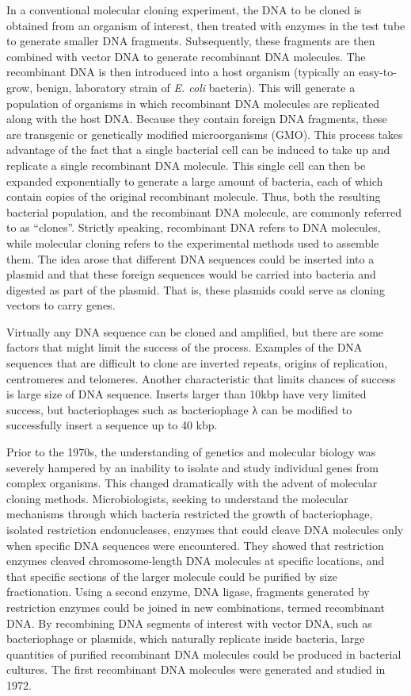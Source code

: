 In a conventional molecular cloning experiment, the DNA to be cloned is obtained from an organism of interest, then treated with enzymes in the test tube to generate smaller DNA fragments. Subsequently, these fragments are then combined with vector DNA to generate recombinant DNA molecules. The recombinant DNA is then introduced into a host organism (typically an easy-to-grow, benign, laboratory strain of \emph{E. coli} bacteria). This will generate a population of organisms in which recombinant DNA molecules are replicated along with the host DNA. Because they contain foreign DNA fragments, these are transgenic or genetically modified microorganisms (GMO). This process takes advantage of the fact that a single bacterial cell can be induced to take up and replicate a single recombinant DNA molecule. This single cell can then be expanded exponentially to generate a large amount of bacteria, each of which contain copies of the original recombinant molecule. Thus, both the resulting bacterial population, and the recombinant DNA molecule, are commonly referred to as ``clones''. Strictly speaking, recombinant DNA refers to DNA molecules, while molecular cloning refers to the experimental methods used to assemble them. The idea arose that different DNA sequences could be inserted into a plasmid and that these foreign sequences would be carried into bacteria and digested as part of the plasmid. That is, these plasmids could serve as cloning vectors to carry genes.

Virtually any DNA sequence can be cloned and amplified, but there are some factors that might limit the success of the process. Examples of the DNA sequences that are difficult to clone are inverted repeats, origins of replication, centromeres and telomeres. Another characteristic that limits chances of success is large size of DNA sequence. Inserts larger than 10kbp have very limited success, but bacteriophages such as bacteriophage λ can be modified to successfully insert a sequence up to 40 kbp.

Prior to the 1970s, the understanding of genetics and molecular biology was severely hampered by an inability to isolate and study individual genes from complex organisms. This changed dramatically with the advent of molecular cloning methods. Microbiologists, seeking to understand the molecular mechanisms through which bacteria restricted the growth of bacteriophage, isolated restriction endonucleases, enzymes that could cleave DNA molecules only when specific DNA sequences were encountered. They showed that restriction enzymes cleaved chromosome-length DNA molecules at specific locations, and that specific sections of the larger molecule could be purified by size fractionation. Using a second enzyme, DNA ligase, fragments generated by restriction enzymes could be joined in new combinations, termed recombinant DNA. By recombining DNA segments of interest with vector DNA, such as bacteriophage or plasmids, which naturally replicate inside bacteria, large quantities of purified recombinant DNA molecules could be produced in bacterial cultures. The first recombinant DNA molecules were generated and studied in 1972.


